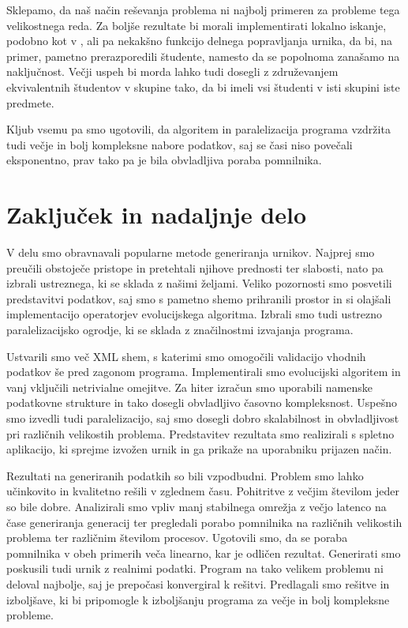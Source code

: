 \documentclass[a4paper,12pt]{book}
\begin{document}
Sklepamo, da naš način reševanja problema ni najbolj primeren za probleme tega velikostnega reda. Za boljše rezultate bi morali implementirati lokalno iskanje, podobno kot v \cite{abdullah2008generating}, ali pa nekakšno funkcijo delnega popravljanja urnika, da bi, na primer, pametno prerazporedili študente, namesto da se popolnoma zanašamo na naključnost. Večji uspeh bi morda lahko tudi dosegli z združevanjem ekvivalentnih študentov v skupine tako, da bi imeli vsi študenti v isti skupini iste predmete. 

Kljub vsemu pa smo ugotovili, da algoritem in paralelizacija programa vzdržita tudi večje in bolj kompleksne nabore podatkov, saj se časi niso povečali eksponentno, prav tako pa je bila obvladljiva poraba pomnilnika. 

\chapter{Zaključek in nadaljnje delo}
V delu smo obravnavali popularne metode generiranja urnikov. Najprej smo preučili obstoječe pristope in pretehtali njihove prednosti ter slabosti, nato pa izbrali ustreznega, ki se sklada z našimi željami. Veliko pozornosti smo posvetili predstavitvi podatkov, saj smo s pametno shemo prihranili prostor in si olajšali implementacijo operatorjev evolucijskega algoritma. Izbrali smo tudi ustrezno paralelizacijsko ogrodje, ki se sklada z značilnostmi izvajanja programa. 

Ustvarili smo več XML shem, s katerimi smo omogočili validacijo vhodnih podatkov še pred zagonom programa. Implementirali smo evolucijski algoritem in vanj vključili netrivialne omejitve. Za hiter izračun smo uporabili namenske podatkovne strukture in tako dosegli obvladljivo časovno kompleksnost. Uspešno smo izvedli tudi paralelizacijo, saj smo dosegli dobro skalabilnost in obvladljivost pri različnih velikostih problema. Predstavitev rezultata smo realizirali s spletno aplikacijo, ki sprejme izvožen urnik in ga prikaže na uporabniku prijazen način. 

Rezultati na generiranih podatkih so bili vzpodbudni. Problem smo lahko učinkovito in kvalitetno rešili v zglednem času. Pohitritve z večjim številom jeder so bile dobre. Analizirali smo vpliv manj stabilnega omrežja z večjo latenco na čase generiranja generacij ter pregledali porabo pomnilnika na različnih velikostih problema ter različnim številom procesov. Ugotovili smo, da se poraba pomnilnika v obeh primerih veča linearno, kar je odličen rezultat. Generirati smo poskusili tudi urnik z realnimi podatki. Program na tako velikem problemu ni deloval najbolje, saj je prepočasi konvergiral k rešitvi. Predlagali smo rešitve in izboljšave, ki bi pripomogle k izboljšanju programa za večje in bolj kompleksne probleme. 
\end{document}
